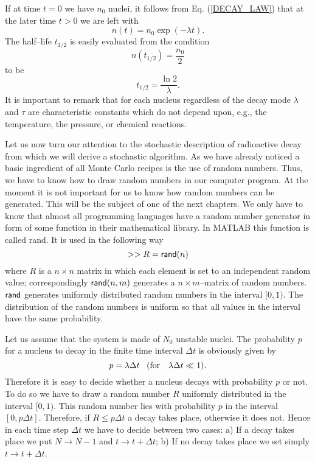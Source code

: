 If at time $t=0$ we have $n_0$ nuclei, it follows from Eq. 
(\ref{DECAY_LAW}) that at the later time $t>0$ we are left
with
\begin{equation}\label{DECAY_NUMBER}
n(t) = n_0 \exp(-\lambda t).
\end{equation}
The half--life $t_{1/2}$ is easily evaluated from the condition
\begin{equation}\label{HALF-LIFE_1}
  n(t_{1/2}) = \frac{n_0}{2}
\end{equation}
to be
\begin{equation}\label{HALF-LIFE_2}
  t_{1/2} = \frac{\ln2}{\lambda}.
\end{equation}
It is important to remark that for each nucleus
regardless of the decay mode $\lambda$
and $\tau$ are characteristic constants which do not depend upon, 
e.g.,
the temperature, the pressure, or chemical reactions.

Let us now turn our attention to the stochastic description of 
radioactive decay from which we will derive a stochastic 
algorithm. As we have already noticed a basic ingredient of all
Monte Carlo recipes is the use of random numbers. Thus, we have to 
know how to draw random numbers in our computer program. At the 
moment it is not important for us to know how random numbers can 
be generated. This will be the subject of one of the next 
chapters. We only have to know that almost all programming
languages have a random number generator in form of some function 
in their mathematical library. In MATLAB this function is called
{\sf rand}. It is used in the following way 
\begin{displaymath}
>> R = {\sf rand}(n)
\end{displaymath}
where $R$ is a $n \times n$ matrix in which each element is set to
an independent random value; correspondingly ${\sf rand}(n,m)$ generates
a $n \times m$--matrix of random numbers. ${\sf rand}$ generates
uniformly distributed random numbers in the interval $[0,1)$. The 
distribution of the random numbers is uniform so that all values 
in the interval have the same probability.


Let us assume that the system is made of $N_0$ 
unstable nuclei. The probability $p$ for a nucleus to decay in the 
finite time interval $\Delta t$ is obviously given by
\begin{equation}\label{DECAY_PROB}
  p = \lambda \Delta t \;\;\;  ({\rm for} \quad \lambda \Delta t \ll 1).
\end{equation}
Therefore it is easy to decide whether a nucleus decays with 
probability $p$ or not. To do so we have to draw a random number $R$
uniformly distributed in the interval $[0,1)$. This random number 
lies with probability $p$ in the interval $[0,p\Delta t]$. 
Therefore, if $R \leq p \Delta t$ a decay takes place, 
otherwise it does not. Hence in each time step $\Delta t$ we have to 
decide between two cases:
a) If a decay takes place we put $N \longrightarrow N-1$ and 
$t \longrightarrow t+\Delta t$; b) If no decay takes place we set 
simply $t \longrightarrow t + \Delta t$.

